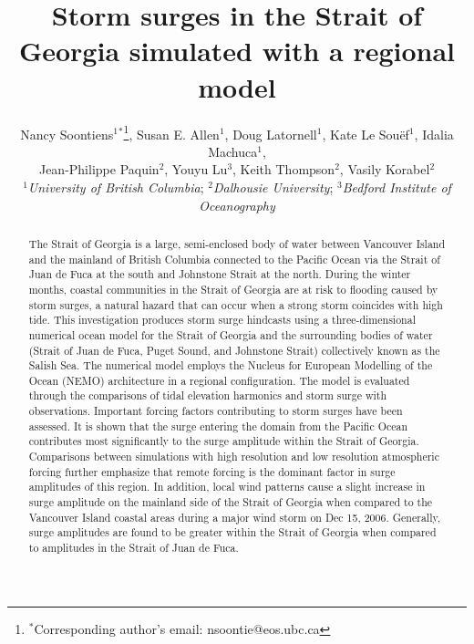 \documentclass[letterpaper]{tATO2e}
\begin{document}


\title{Storm surges in the Strait of Georgia simulated with a regional model}

\author{Nancy Soontiens$^{1}$$^{\ast}$\thanks{$^\ast$Corresponding author's email: nsoontie@eos.ubc.ca
\vspace{6pt}}, Susan E. Allen$^{1}$,  Doug Latornell$^{1}$,  Kate Le Sou\"{e}f$^{1}$, Idalia Machuca$^{1}$,\\ Jean-Philippe Paquin$^{2}$,
Youyu Lu$^{3}$, Keith Thompson$^{2}$, Vasily Korabel$^{2}$
\\\vspace{6pt}  $^{1}${\em{University of British Columbia}};
$^{2}${\em{Dalhousie University}};
$^{3}${\em{Bedford Institute of Oceanography}}\\ }

\maketitle

\begin{abstract}
The Strait of Georgia is a large, semi-enclosed body of water between Vancouver Island and the mainland of British Columbia connected to the Pacific Ocean via the Strait of Juan de Fuca at the south and Johnstone Strait at the north. During the winter months, coastal communities in the Strait of Georgia are at risk to flooding caused by storm surges, a natural hazard that can occur when a strong storm coincides with high tide. This investigation produces storm surge hindcasts using a three-dimensional numerical ocean model for the Strait of Georgia and the surrounding bodies of water (Strait of Juan de Fuca, Puget Sound, and Johnstone Strait) collectively known as the Salish Sea. The numerical model employs the Nucleus for European Modelling of the Ocean (NEMO) architecture in a regional configuration. The model is evaluated through {\color{red} the} comparisons of tidal elevation harmonics and storm surge with observations. Important forcing factors contributing to storm surges have been assessed. It is shown that the surge entering the domain from the Pacific Ocean contributes most significantly to the {\color{red} surge amplitude within the Strait of Georgia. Comparisons between simulations with high resolution and low resolution atmospheric forcing further emphasize that remote forcing is the dominant factor in surge amplitudes of this region.} In addition, local wind patterns cause a slight increase in surge amplitude on the mainland side of the Strait of Georgia when compared to the Vancouver Island coastal areas during a major wind storm on Dec 15, 2006. Generally, surge amplitudes are found to be greater within the Strait of Georgia when compared to amplitudes in the Strait of Juan de Fuca.
\end{abstract}
\end{document}
